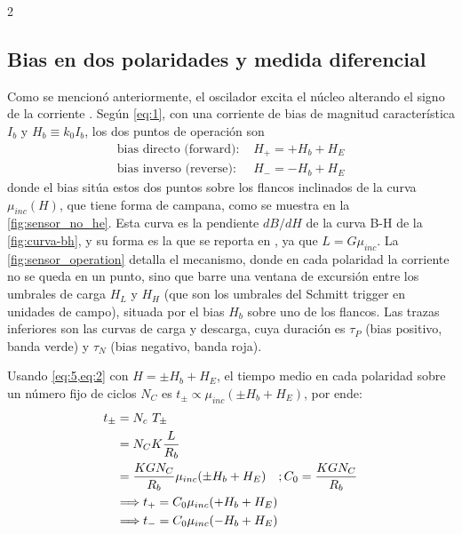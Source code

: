 \documentclass[11pt,letterpaper]{article}
\begin{document}
\begin{multicols*}{2}
\subsection{Bias en dos polaridades y medida diferencial}
Como se mencionó anteriormente, el oscilador excita el núcleo alterando el signo de la corriente \citep{leuzinger2010,regoli2018}. Según \cref{eq:1}, con una corriente de bias de magnitud característica $I_b$ y $H_b \equiv k_0I_b$, los dos puntos de operación son
\begin{align}
    \text{bias directo (forward): }& H_+ = +H_b + H_E \\
    \text{bias inverso (reverse): }& H_- = -H_b + H_E
\end{align}
donde el bias sitúa estos dos puntos sobre los flancos inclinados de la curva $\mu_{inc}(H)$, que tiene forma de campana, como se muestra en la \cref{fig:sensor_no_he}. Esta curva es la pendiente  $dB/dH$ de la curva B-H de la \cref{fig:curva-bh}, y su forma es la que se reporta en \citet{leuzinger2010}, ya que $L = G\mu_{inc}$. La \cref{fig:sensor_operation} detalla el mecanismo, donde en cada polaridad la corriente no se queda en un punto, sino que barre una ventana de excursión entre los umbrales de carga $H_L$ y $H_H$ (que son los umbrales del Schmitt trigger en unidades de campo), situada por el bias $H_b$ sobre uno de los flancos. Las trazas inferiores son las curvas de carga y descarga, cuya duración es $\tau_P$ (bias positivo, banda verde) y $\tau_N$ (bias negativo, banda roja).

Usando \cref{eq:5,eq:2} con $H = \pm H_b + H_E$, el tiempo medio en cada polaridad sobre un número fijo de ciclos $N_C$ es $t_{\pm} \propto \mu_{inc}(\pm H_b + H_E)$, por ende:
\begin{align}
    t_{\pm} &= N_c\ T_{\pm} \notag\\
            &= N_C K\dfrac{L}{R_b} \notag\\
            &= \dfrac{KGN_C}{R_b}\mu_{inc}(\pm H_b + H_E) \quad ; C_0 =\dfrac{KGN_C}{R_b} \notag\\
    &\Longrightarrow t_+ = C_0\mu_{inc}(+H_b+H_E)\\
    &\Longrightarrow t_- = C_0\mu_{inc}(-H_b + H_E)       
\end{align}


\end{multicols*}
\end{document}
